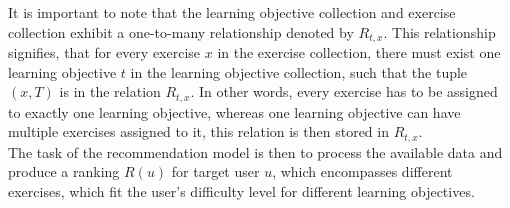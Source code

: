\documentclass{Academic}
\begin{document}
        It is important to note that the learning objective collection and exercise collection exhibit a one-to-many relationship denoted by $R_{t,x}$. This relationship signifies, that for every exercise $x$ in the exercise collection, there must exist one learning objective $t$ in the learning objective collection, such that the tuple $(x,T)$ is in the relation $R_{t,x}$. In other words, every exercise has to be assigned to exactly one learning objective, whereas one learning objective can have multiple exercises assigned to it, this relation is then stored in $R_{t,x}$.\\
        The task of the recommendation model is then to process the available data and produce a ranking $R(u)$ for target user $u$, which encompasses different exercises, which fit the user's difficulty level for different learning objectives.
        
        \FloatBarrier
\end{document}
